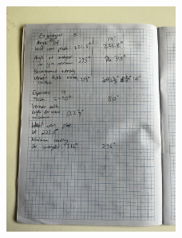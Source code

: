 \documentclass{article}
\begin{document}
\begin{figure}[H]
    \vspace{0.5cm}
    \includegraphics[width=0.5\textwidth,angle=270,origin=c]{labbook12.jpg}
\end{figure}
\end{document}
